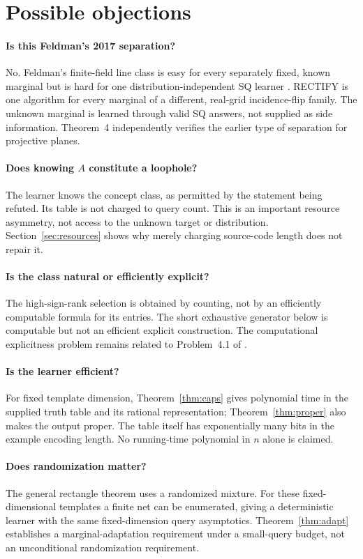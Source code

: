 \section{Possible objections}\label{sec:objections}
\paragraph{Is this Feldman's 2017 separation?}
No. Feldman's finite-field line class is easy for every separately fixed, known marginal but is hard for one distribution-independent SQ learner \citep[Theorems~7.7--7.8]{Feldman17}. RECTIFY is one algorithm for every marginal of a different, real-grid incidence-flip family. The unknown marginal is learned through valid SQ answers, not supplied as side information. Theorem~4 independently verifies the earlier type of separation for projective planes.

\paragraph{Does knowing $A$ constitute a loophole?}
The learner knows the concept class, as permitted by the statement being refuted. Its table is not charged to query count. This is an important resource asymmetry, not access to the unknown target or distribution. Section~\ref{sec:resources} shows why merely charging source-code length does not repair it.

\paragraph{Is the class natural or efficiently explicit?}
The high-sign-rank selection is obtained by counting, not by an efficiently computable formula for its entries. The short exhaustive generator below is computable but not an efficient explicit construction. The computational explicitness problem remains related to Problem~4.1 of \citet{HHPTZ22}.

\paragraph{Is the learner efficient?}
For fixed template dimension, Theorem~\ref{thm:caps} gives polynomial time in the supplied truth table and its rational representation; Theorem~\ref{thm:proper} also makes the output proper. The table itself has exponentially many bits in the example encoding length. No running-time polynomial in $n$ alone is claimed.

\paragraph{Does randomization matter?}
The general rectangle theorem uses a randomized mixture. For these fixed-dimensional templates a finite net can be enumerated, giving a deterministic learner with the same fixed-dimension query asymptotics. Theorem~\ref{thm:adapt} establishes a marginal-adaptation requirement under a small-query budget, not an unconditional randomization requirement.


